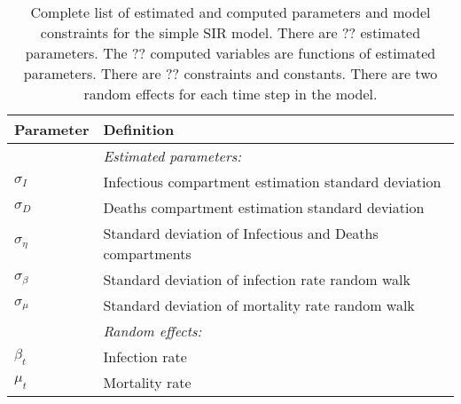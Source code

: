 \documentclass[12pt,letterpaper]{article}
\begin{document}
\begin{table}[b]
\caption{Complete list of estimated and computed parameters and model
constraints for the simple SIR model.
There are ?? estimated parameters. 
The ?? computed variables are functions of estimated parameters.
There are ?? constraints and constants.
There are two random effects for each time step in the model.
}
\label{tab:allvars1}
\begin{center}
\begin{tabular}{ll}
\hline
Parameter & Definition\\
\hline
\hline
       & {\it Estimated parameters:}\\
$\sigma_I$ & Infectious compartment estimation standard deviation\\
$\sigma_D$ & Deaths compartment estimation standard deviation\\
$\sigma_\eta$ & Standard deviation of Infectious and Deaths compartments\\
$\sigma_\beta$ & Standard deviation of infection rate random walk\\
$\sigma_\mu$ & Standard deviation of mortality rate random walk\\
       & {\it Random effects:}\\
$\beta_t$ & Infection rate\\
$\mu_t$ & Mortality rate\\
\hline
\end{tabular}
\end{center}
\end{table}

\printbibliography[title=References]
\end{document}
